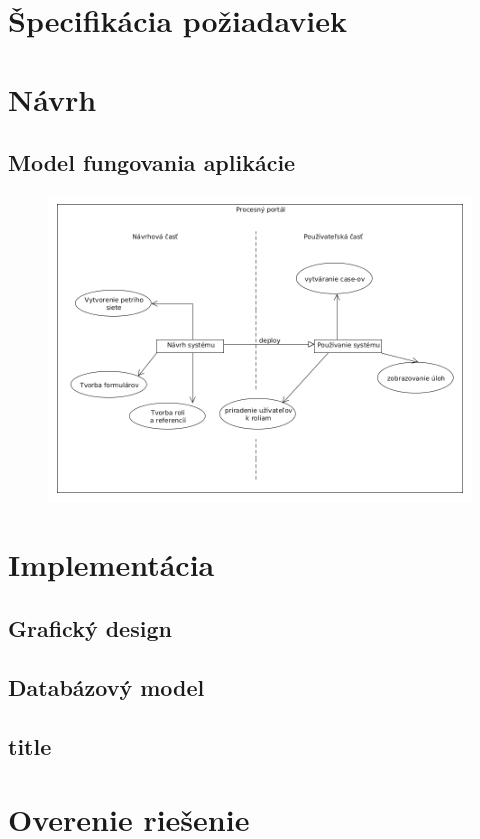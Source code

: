 

\section{Špecifikácia požiadaviek}

\section{Návrh}

	\subsection{Model fungovania aplikácie}

	\begin{figure}
		\centering
		\includegraphics[width=0.7\linewidth]{../../uml/model_apk}
		\caption{}
		\label{fig:model_apk}
	\end{figure}

\section{Implementácia}
	
	\subsection{Grafický design}
	
	\subsection{Databázový model}
	
	\subsection{title}
	
\section{Overenie riešenie}
	
	
